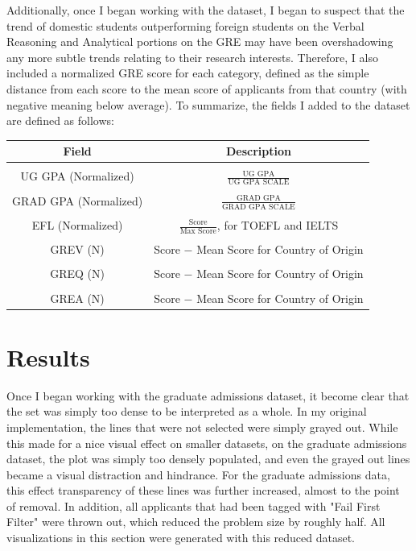 \documentclass[]{article}
\begin{document}
		\par Additionally, once I began working with the dataset, I began to suspect that the trend of domestic students outperforming foreign students on the Verbal Reasoning and Analytical portions on the GRE may have been overshadowing any more subtle trends relating to their research interests. Therefore, I also included a normalized GRE score for each category, defined as the simple distance from each score to the mean score of applicants from that country (with negative meaning below average). To summarize, the fields I added to the dataset are defined as follows: \\
		
		\begin{tabular}{c|c}
			Field & Description \\ \hline \\
			UG GPA (Normalized) & $\frac {\text{UG GPA}}{\text{UG GPA SCALE}}$\\ \\
			GRAD GPA (Normalized) &  $\frac{\text{GRAD GPA}}{\text{GRAD GPA SCALE}}$\\ \\
			EFL (Normalized) & $\frac{\text{Score}}{\text{Max Score}}$, for TOEFL and IELTS\\	\\	
			GREV (N) & Score $-$ Mean Score for Country of Origin \\ \\
			GREQ (N) & Score $-$ Mean Score for Country of Origin \\ \\
			GREA (N) & Score $-$ Mean Score for Country of Origin	\\
		\end{tabular}
		
\section{Results}
	Once I began working with the graduate admissions dataset, it become clear that the set was simply too dense to be interpreted as a whole. In my original implementation, the lines that were not selected were simply grayed out. While this made for a nice visual effect on smaller datasets, on the graduate admissions dataset, the plot was simply too densely populated, and even the grayed out lines became a visual distraction and hindrance. For the graduate admissions data, this effect transparency of these lines was further increased, almost to the point of removal. In addition, all applicants that had been tagged with "Fail First Filter" were thrown out, which reduced the problem size by roughly half. All visualizations in this section were generated with this reduced dataset.
	
\end{document}
